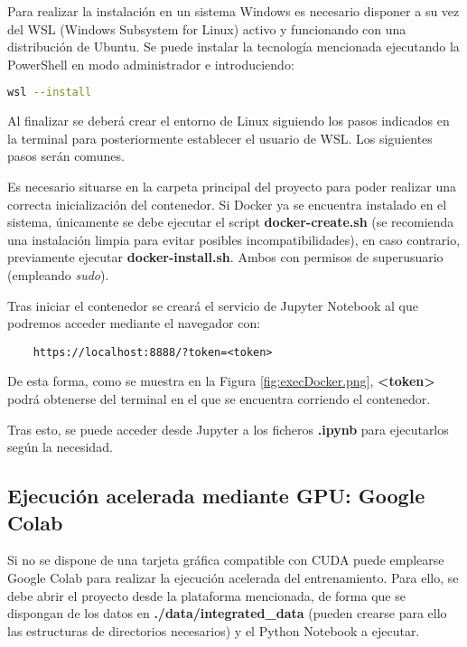 Para realizar la instalación en un sistema Windows es necesario disponer a su vez del WSL (Windows Subsystem for Linux) activo y funcionando con una distribución
de Ubuntu.
Se puede instalar la tecnología mencionada ejecutando la PowerShell en modo administrador e introduciendo:
\begin{lstlisting}[language=Bash]
    wsl --install
\end{lstlisting}

Al finalizar se deberá crear el entorno de Linux siguiendo los pasos indicados en la terminal para posteriormente establecer el usuario
de WSL.
Los siguientes pasos serán comunes.

Es necesario situarse en la carpeta principal del proyecto para poder realizar una correcta inicialización del contenedor. 
Si Docker ya se encuentra instalado en el sistema, únicamente se debe ejecutar el script \textbf{docker-create.sh} (se recomienda una instalación limpia para evitar
posibles incompatibilidades), en caso contrario,
previamente ejecutar \textbf{docker-install.sh}. Ambos con permisos de superusuario (empleando \textit{sudo}).

Tras iniciar el contenedor se creará el servicio de Jupyter Notebook al que podremos acceder mediante el navegador con:
\begin{lstlisting}
    https://localhost:8888/?token=<token>
\end{lstlisting}

De esta forma, como se muestra en la Figura \ref{fig:execDocker.png}, \textbf{<token>} podrá obtenerse del terminal en el que se encuentra corriendo
el contenedor.


Tras esto, se puede acceder desde Jupyter a los ficheros \textbf{.ipynb} para ejecutarlos según la necesidad.

\subsection{Ejecución acelerada mediante GPU: Google Colab}
Si no se dispone de una tarjeta gráfica compatible con CUDA puede emplearse Google Colab para realizar la ejecución acelerada del entrenamiento.
Para ello, se debe abrir el proyecto desde la plataforma mencionada, de forma que se dispongan de los datos en \textbf{./data/integrated\_data} 
(pueden crearse para ello las estructuras de directorios necesarios) y el Python Notebook a ejecutar.

